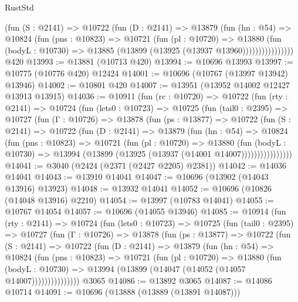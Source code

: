 \begin{lexlean}{RustStd}
\begin{coremodule}
                  (fun (S : @2141) =>
                  @10722
                    (fun (D : @2141) =>
                    @13879
                      (fun (hn : @54) =>
                      @10824
                        (fun (pns : @10823) =>
                        @10721
                          (fun (pl : @10720) =>
                          @13880
                            (fun (bodyL : @10730) =>
                            @13885 (@13899 (@13925 (@13937 @13960))))))))))))))))
    @420
@13993 := @13881 (@10713 @420)
@13994 := @10696 @13993
@13997 := @10775 (@10776 @420) @12424
@14001 := @10696 (@10767 (@13997 @13942) @13946)
@14002 := @10801 @420
@14007 := @13951 (@13952 @14002 @12427 @13913 @13915)
@14036 := @10911
    (fun (rc : @10720) =>
    @10722
      (fun (rty : @2141) =>
      @10724
        (fun (lets0 : @10723) =>
        @10725
          (fun (tail0 : @2395) =>
          @10727
            (fun (Γ : @10726) =>
            @13878
              (fun (ps : @13877) =>
              @10722
                (fun (S : @2141) =>
                @10722
                  (fun (D : @2141) =>
                  @13879
                    (fun (hn : @54) =>
                    @10824
                      (fun (pns : @10823) =>
                      @10721
                        (fun (pl : @10720) =>
                        @13880
                          (fun (bodyL : @10730) =>
                          @13994 (@13899 (@13925 (@13937 (@14001 @14007))))))))))))))))
@14041 := @3040 (@2424 (@2371 (@2427 @2205) @2381))
@14042 := @14036 @14041
@14043 := @13910 @14041
@14047 := @10696 (@13902 (@14043 @13916) @13923)
@14048 := @13932 @14041
@14052 := @10696 (@10826 (@14048 @13916) @2210)
@14054 := @13997 (@10783 @14041)
@14055 := @10767 @14054
@14057 := @10696 (@14055 @13946)
@14085 := @10914
    (fun (rty : @2141) =>
    @10724
      (fun (lets0 : @10723) =>
      @10725
        (fun (tail0 : @2395) =>
        @10727
          (fun (Γ : @10726) =>
          @13878
            (fun (ps : @13877) =>
            @10722
              (fun (S : @2141) =>
              @10722
                (fun (D : @2141) =>
                @13879
                  (fun (hn : @54) =>
                  @10824
                    (fun (pns : @10823) =>
                    @10721
                      (fun (pl : @10720) =>
                      @13880
                        (fun (bodyL : @10730) =>
                        @13994 (@13899 (@14047 (@14052 (@14057 @14007)))))))))))))))
    @3065
@14086 := @13892 @3065
@14087 := @14086 @10714
@14091 := @10696 (@13888 (@13889 (@13891 @14087)))

\end{coremodule}
\end{lexlean}
